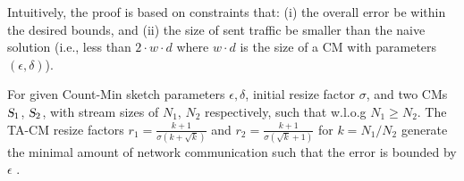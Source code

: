 Intuitively, the proof is based on constraints that: (i) the overall error be within the desired bounds, and (ii) the size of sent traffic be smaller than the naive solution (i.e., less than $2\cdot w \cdot d$ where $w \cdot d$ is the size of a CM with parameters $(\epsilon, \delta)$).

\begin{theorem}
For given Count-Min sketch parameters $\epsilon, \delta$,  initial resize factor $\sigma$, and two CMs $\textsl{S}_1$, $\textsl{S}_2$, with stream sizes of $N_1$, $N_2$ respectively, such that w.l.o.g $N_1 \geq N_2$. The TA-CM resize factors $r_1=\frac{k + 1}{\sigma  (k + \sqrt{k})}$ and $r_2=\frac{k+1}{\sigma(\sqrt{k}+1)}$ for $k = N_1 / N_2$ generate the minimal amount of network communication such that the error is bounded by $\epsilon$ .
\label{sktc-thm:two-sketches}
\end{theorem}

